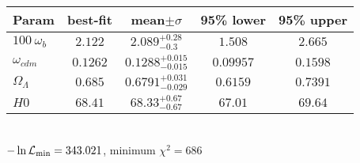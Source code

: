\begin{tabular}{|l|c|c|c|c|} 
 \hline 
Param & best-fit & mean$\pm\sigma$ & 95\% lower & 95\% upper \\ \hline 
$100~\omega_{b }$ &$2.122$ & $2.089_{-0.3}^{+0.28}$ & $1.508$ & $2.665$ \\ 
$\omega_{cdm }$ &$0.1262$ & $0.1288_{-0.015}^{+0.015}$ & $0.09957$ & $0.1598$ \\ 
$\Omega_{\Lambda }$ &$0.685$ & $0.6791_{-0.029}^{+0.031}$ & $0.6159$ & $0.7391$ \\ 
$H0$ &$68.41$ & $68.33_{-0.67}^{+0.67}$ & $67.01$ & $69.64$ \\ 
\hline 
 \end{tabular} \\ 
$-\ln{\cal L}_\mathrm{min} =343.021$, minimum $\chi^2=686$ \\ 
